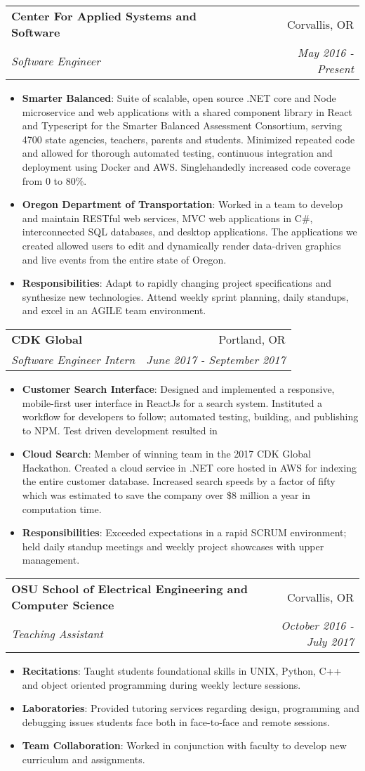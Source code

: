 \documentclass[letterpaper,11pt]{article}
\makeatletter
\newcommand{\resumeItem}[2]{
  \item\small{
    \textbf{#1}{: #2 \vspace{-2pt}}
  }
}
\newcommand{\resumeSubheading}[4]{
  \vspace{-1pt}\item
    \begin{tabular*}{0.97\textwidth}{l@{\extracolsep{\fill}}r}
      \textbf{#1} & #2 \\
      \textit{\small#3} & \textit{\small #4} \\
    \end{tabular*}\vspace{-5pt}
}
\newcommand{\resumeItemListStart}{\begin{itemize}}
\newcommand{\resumeItemListEnd}{\end{itemize}\vspace{-5pt}}
\makeatother
\begin{document}
    \resumeSubheading
      {Center For Applied Systems and Software}{Corvallis, OR}
      {Software Engineer}{May 2016 - Present}
      \resumeItemListStart
        \resumeItem{Smarter Balanced}
          {Suite of scalable, open source .NET core and Node microservice and web applications with a shared component library in React and Typescript for the Smarter Balanced Assessment Consortium, serving 4700 state agencies, teachers, parents and students. Minimized repeated code and allowed for thorough automated testing, continuous integration and deployment using Docker and AWS. Singlehandedly increased code coverage from 0 to 80\%.}
        \resumeItem{Oregon Department of Transportation}
          {Worked in a team to develop and maintain RESTful web services, MVC web applications in C\#, interconnected SQL databases, and desktop applications. The applications we created allowed users to edit and dynamically render data-driven graphics and live events from the entire state of Oregon.}
        \resumeItem{Responsibilities}
        {Adapt to rapidly changing project specifications and synthesize new technologies. Attend weekly sprint planning, daily standups, and excel in an AGILE team environment.} 
      \resumeItemListEnd

    \resumeSubheading
      {CDK Global}{Portland, OR}
      {Software Engineer Intern}{June 2017 - September 2017}
      \resumeItemListStart
        \resumeItem{Customer Search Interface}
          {Designed and implemented a responsive, mobile-first user interface in ReactJs for a search system. Instituted a workflow for developers to follow; automated testing, building, and publishing to NPM. Test driven development resulted in}
        \resumeItem{Cloud Search}
          {Member of winning team in the 2017 CDK Global Hackathon. Created a cloud service in .NET core hosted in AWS for indexing the entire customer database. Increased search speeds by a factor of fifty which was estimated to save the company over \$8 million a year in computation time.}
        \resumeItem{Responsibilities}{Exceeded expectations in a rapid SCRUM environment; held daily standup meetings and weekly project showcases with upper management.}
      \resumeItemListEnd

    \resumeSubheading
      {OSU School of Electrical Engineering and Computer Science}{Corvallis, OR}
      {Teaching Assistant}{October 2016 - July 2017}
      \resumeItemListStart
        \resumeItem{Recitations}{Taught students foundational skills in UNIX, Python, C++ and object oriented programming during weekly lecture sessions.}
        \resumeItem{Laboratories}{Provided tutoring services regarding design, programming and debugging issues students face both in face-to-face and remote sessions.}
        \resumeItem{Team Collaboration}{Worked in conjunction with faculty to develop new curriculum and assignments.}
      \resumeItemListEnd
\end{document}
